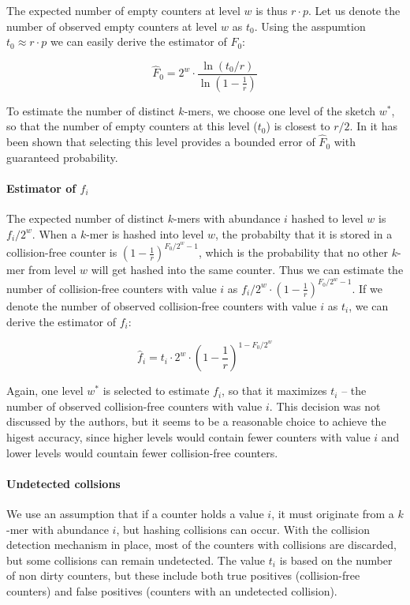 The expected number of empty counters at level $w$ is thus $r \cdot p$. Let us denote the
number of observed empty counters at level $w$ as $t_0$. Using the asspumtion
$t_0 \approx r \cdot p$ we can easily derive the estimator of $F_0$:

$$ \hat F_0 = 2^w \cdot \frac{\ln(t_0/r)}{\ln\left(1 - \frac{1}{r}\right)} $$

To estimate the number of distinct $k$-mers, we choose one level of the sketch
$w^*$, so that the number of empty counters at this level ($t_0$) is closest to $r/2$.
In \cite{Melsted2014} it has been shown that selecting this level
provides a bounded error of $\hat F_0$ with guaranteed probability.

\paragraph{Estimator of $f_i$}
The expected number of distinct $k$-mers with abundance $i$ hashed to level $w$ is $f_i / 2^w$.
When a $k$-mer is hashed into level $w$, the probabilty that it is stored in a collision-free
counter is $(1 - \frac{1}{r})^{F_0/2^w - 1}$, which is the probability that no other $k$-mer 
from level $w$ will get hashed into the same counter. Thus we can estimate the number of
collision-free counters with value $i$ as  $f_i / 2^w \cdot (1 - \frac{1}{r})^{F_0/2^w - 1}$.
If we denote the number of observed collision-free counters with value $i$ as $t_i$,
we can derive the estimator of $f_i$:

$$ \hat f_i = t_i \cdot 2^w \cdot \left(1 - \frac{1}{r}\right)^{1 - F_0/2^w} $$

Again, one level $w^*$ is selected to estimate $f_i$, so that it maximizes $t_i$ -- the number 
of observed collision-free counters with value $i$. This decision was not discussed by the authors,
but it seems to be a reasonable choice to achieve the higest accuracy, since higher levels
would contain fewer counters with value $i$ and lower levels would countain fewer
collision-free counters.

\paragraph{Undetected collsions}
We use an assumption that if a counter holds a value $i$, it must originate from a $k$-mer 
with abundance $i$, but hashing collisions can occur. With the collision detection mechanism
in place, most of the counters with collisions are discarded, but some collisions can remain
undetected. The value $t_i$ is based on the number of non dirty counters, but these include both
true positives (collision-free counters) and false positives (counters with an undetected
collision). 

